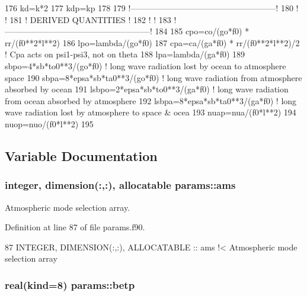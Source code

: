 \begin{DoxyCode}
176     kd=k*2
177     kdp=kp
178 
179     \textcolor{comment}{!-----------------------------------------------------!}
180     \textcolor{comment}{!                                                     !}
181     \textcolor{comment}{! DERIVED QUANTITIES                                  !}
182     \textcolor{comment}{!                                                     !}
183     \textcolor{comment}{!-----------------------------------------------------!}
184 
185     cpo=co/(go*f0) * rr/(f0**2*l**2)
186     lpo=lambda/(go*f0)
187     cpa=ca/(ga*f0) * rr/(f0**2*l**2)/2 \textcolor{comment}{! Cpa acts on psi1-psi3, not on theta}
188     lpa=lambda/(ga*f0)
189     sbpo=4*sb*to0**3/(go*f0) \textcolor{comment}{! long wave radiation lost by ocean to atmosphere space}
190     sbpa=8*epsa*sb*ta0**3/(go*f0) \textcolor{comment}{! long wave radiation from atmosphere absorbed by ocean}
191     lsbpo=2*epsa*sb*to0**3/(ga*f0) \textcolor{comment}{! long wave radiation from ocean absorbed by atmosphere}
192     lsbpa=8*epsa*sb*ta0**3/(ga*f0) \textcolor{comment}{! long wave radiation lost by atmosphere to space & ocea}
193     nuap=nua/(f0*l**2)
194     nuop=nuo/(f0*l**2)
195 
\end{DoxyCode}


\subsection{Variable Documentation}
\subsubsection[{\texorpdfstring{ams}{ams}}]{\setlength{\rightskip}{0pt plus 5cm}integer, dimension(\+:,\+:), allocatable params\+::ams}\hypertarget{namespaceparams_aa95299f1a9c54693b85e049004369089}{}\label{namespaceparams_aa95299f1a9c54693b85e049004369089}


Atmospheric mode selection array. 



Definition at line 87 of file params.\+f90.


\begin{DoxyCode}
87   \textcolor{keywordtype}{INTEGER}, \textcolor{keywordtype}{DIMENSION(:,:)}, \textcolor{keywordtype}{ALLOCATABLE} :: ams\textcolor{comment}{   !< Atmospheric mode selection array}
\end{DoxyCode}
\subsubsection[{\texorpdfstring{betp}{betp}}]{\setlength{\rightskip}{0pt plus 5cm}real(kind=8) params\+::betp}\hypertarget{namespaceparams_a9ffe87bb8aaab8a0d4f8d5f644b98785}{}\label{namespaceparams_a9ffe87bb8aaab8a0d4f8d5f644b98785}


